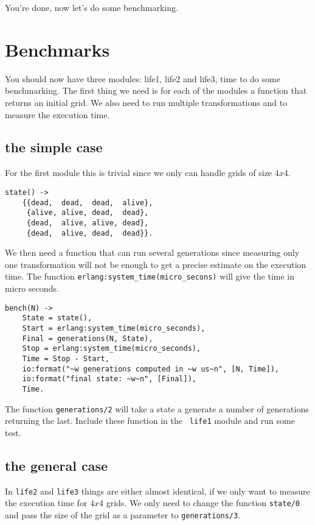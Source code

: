 \documentclass[a4paper,11pt]{article}
\begin{document}
You're done, now let's do some benchmarking. 

\section{Benchmarks}

You should now have three modules: life1, life2 and life3, time to do
some benchmarking. The first thing we need is for each of the modules
a function that returns an initial grid. We also need to run multiple
transformations and to measure the execution time.

\subsection{the simple case}

For the first module this is
trivial since we only can handle grids of size $4x4$. 


\begin{verbatim}
state() ->
    {{dead,  dead,  dead,  alive},
     {alive, alive, dead,  dead},
     {dead,  alive, alive, dead},
     {dead,  alive, dead,  dead}}.
\end{verbatim}

We then need a function that can run several generations since
measuring only one transformation will not be enough to get a precise
estimate on the execution time. The function {\tt erlang:system\_time(micro\_secons)} will give the time in micro seconds.

\begin{verbatim}
bench(N) ->
    State = state(),
    Start = erlang:system_time(micro_seconds),
    Final = generations(N, State),
    Stop = erlang:system_time(micro_seconds),
    Time = Stop - Start,
    io:format("~w generations computed in ~w us~n", [N, Time]),
    io:format("final state: ~w~n", [Final]),
    Time.
\end{verbatim}

The function {\tt generations/2} will take a state a generate a number
of generations returning the last. Include these function in the {\tt
  life1} module and run some test. 


\subsection{the general case}

In {\tt life2} and {\tt life3} things are either almost identical, if
we only want to measure the execution time for $4x4$ grids. We only
need to change the function {\tt state/0} and pass the size of the
grid as a parameter to {\tt generations/3}.
\end{document}
